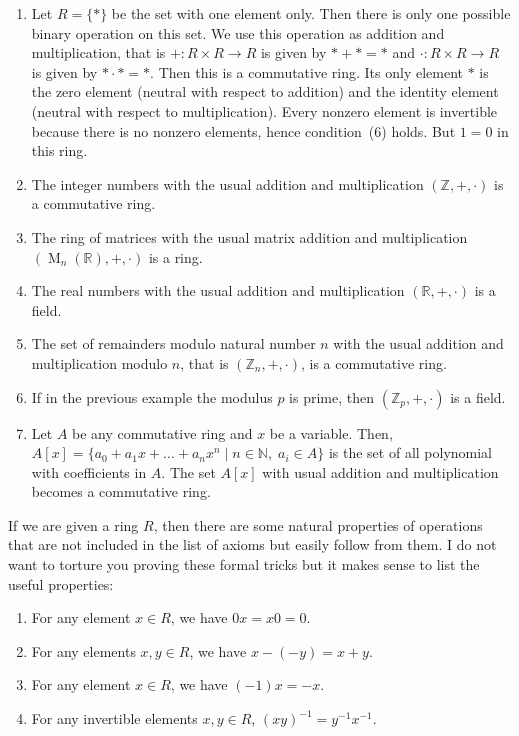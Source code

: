 \begin{examples}
\begin{enumerate}
\item Let $R = \{*\}$ be the set with one element only.
Then there is only one possible binary operation on this set.
We use this operation as addition and multiplication, that is $+\colon R\times R\to R$ is given by $* + * = *$ and $\cdot \colon R\times R\to R$ is given by $* \cdot * = *$.
Then this is a commutative ring.
Its only element $*$ is the zero element (neutral with respect to addition) and the identity element (neutral with respect to multiplication).
Every nonzero element is invertible because there is no nonzero elements, hence condition~(6) holds.
But $1 = 0$ in this ring.

\item The integer numbers with the usual addition and multiplication $(\mathbb Z, +, \cdot)$ is a commutative ring.

\item The ring of matrices with the usual matrix addition and multiplication $(\operatorname{M}_n(\mathbb R), +, \cdot)$ is a ring.

\item The real numbers with the usual addition and multiplication $(\mathbb R, +, \cdot)$ is a field.

\item The set of remainders modulo natural number $n$ with the usual addition and multiplication modulo $n$, that is $(\mathbb Z_n, +, \cdot)$, is a commutative ring.

\item If in the previous example the modulus $p$ is prime, then $(\mathbb Z_p, +,\cdot)$ is a field.%

\item Let $A$ be any commutative ring and $x$ be a variable.
Then, $A[x] = \{a_0 + a_1 x + \ldots + a_n x^n \mid n\in \mathbb N,\; a_i\in A\}$ is the set of all polynomial with coefficients in $A$.
The set $A[x]$ with usual addition and multiplication becomes a commutative ring.
\end{enumerate}
\end{examples}

\begin{remark}
If we are given a ring $R$, then there are some natural properties of operations that are not included in the list of axioms but easily follow from them.
I do not want to torture you proving these formal tricks but it makes sense to list the useful properties:
\begin{enumerate}
\item For any element $x\in R$, we have $0 x = x 0  = 0$.

\item For any elements $x, y\in R$, we have $x - (-y) = x + y$.

\item For any element $x\in R$, we have $(-1) x = - x$.

\item For any invertible elements $x,y\in R$, $(xy)^{-1} = y^{-1}x^{-1}$.
\end{enumerate}
\end{remark}

